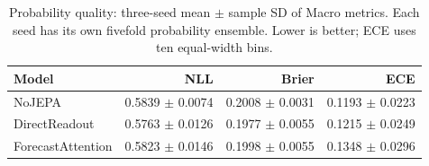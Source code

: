 \begin{table}[t]
\centering
\small
\caption{Probability quality: three-seed mean $\pm$ sample SD of Macro metrics. Each seed has its own fivefold probability ensemble. Lower is better; ECE uses ten equal-width bins.}
\label{tab:calibration}
\begin{tabular}{lrrr}
\toprule
Model & NLL & Brier & ECE \\
\midrule
NoJEPA & 0.5839 $\pm$ 0.0074 & 0.2008 $\pm$ 0.0031 & 0.1193 $\pm$ 0.0223 \\
DirectReadout & 0.5763 $\pm$ 0.0126 & 0.1977 $\pm$ 0.0055 & 0.1215 $\pm$ 0.0249 \\
ForecastAttention & 0.5823 $\pm$ 0.0146 & 0.1998 $\pm$ 0.0055 & 0.1348 $\pm$ 0.0296 \\
\bottomrule
\end{tabular}
\end{table}
